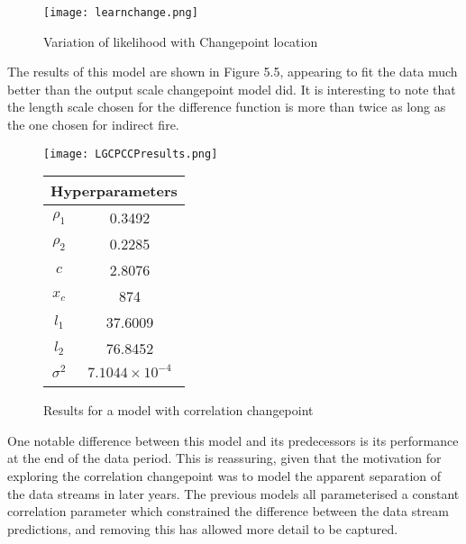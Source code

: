 \documentclass[a4paper,11pt]{report}
\begin{document}

\begin{figure}
\centering
\texttt{[image: learnchange.png]}
\caption{Variation of likelihood with Changepoint location}
\label{fig:cccpvariation}
\end{figure}

The results of this model are shown in Figure 5.5, appearing to fit the data much better than the output scale changepoint model did. It is interesting to note that the length scale chosen for the difference function is more than twice as long as the one chosen for indirect fire.


  \begin{figure}[!ht]
    \centering
    \texttt{[image: LGCPCCPresults.png]}
    \qquad
    \doublespacing
    \begin{tabular}[b]{cc}
    \multicolumn{2}{c}{\textbf{Hyperparameters}}                                            \\ \hline
      \(\rho_1\)                    & 0.3492                \\                       
\(\rho_2\)                     & 0.2285                           \\            
\(c\)                               & 2.8076                                      \\ 
\(x_c\)                        & 874                                         \\ 
\(l_1\)                               & 37.6009                                      \\  
\(l_2\) & 76.8452 \\ 
\(\sigma^2\) & \(7.1044 \times 10^{-4}\) \\ 
& \\
    \end{tabular}
    \captionsetup{labelformat=andtable}
    \caption{Results for a model with correlation changepoint}
  \end{figure}

One notable difference between this model and its predecessors is its performance at the end of the data period. This is reassuring, given that the motivation for exploring the correlation changepoint was to model the apparent separation of the data streams in later years. The previous models all parameterised a constant correlation parameter which constrained the difference between the data stream predictions, and removing this has allowed more detail to be captured.
\end{document}

